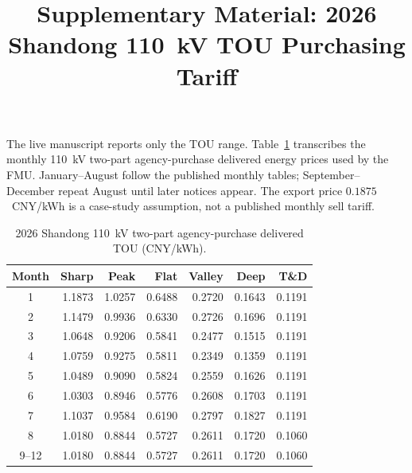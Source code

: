 \documentclass[conference]{IEEEtran}
\begin{document}
\title{Supplementary Material: 2026 Shandong 110~kV TOU Purchasing Tariff}
\author{}
\maketitle

The live manuscript reports only the TOU range. Table~\ref{tab:tou-monthly} transcribes the monthly 110~kV two-part agency-purchase delivered energy prices used by the FMU. January--August follow the published monthly tables; September--December repeat August until later notices appear. The export price \(0.1875\)~CNY/kWh is a case-study assumption, not a published monthly sell tariff.

\begin{table}[!t]
\centering
\caption{2026 Shandong 110~kV two-part agency-purchase delivered TOU (CNY/kWh).}
\label{tab:tou-monthly}
\scriptsize
\begin{tabular}{@{}crrrrrr@{}}
\toprule
Month & Sharp & Peak & Flat & Valley & Deep & T\&D \\
\midrule
1 & 1.1873 & 1.0257 & 0.6488 & 0.2720 & 0.1643 & 0.1191 \\
2 & 1.1479 & 0.9936 & 0.6330 & 0.2726 & 0.1696 & 0.1191 \\
3 & 1.0648 & 0.9206 & 0.5841 & 0.2477 & 0.1515 & 0.1191 \\
4 & 1.0759 & 0.9275 & 0.5811 & 0.2349 & 0.1359 & 0.1191 \\
5 & 1.0489 & 0.9090 & 0.5824 & 0.2559 & 0.1626 & 0.1191 \\
6 & 1.0303 & 0.8946 & 0.5776 & 0.2608 & 0.1703 & 0.1191 \\
7 & 1.1037 & 0.9584 & 0.6190 & 0.2797 & 0.1827 & 0.1191 \\
8 & 1.0180 & 0.8844 & 0.5727 & 0.2611 & 0.1720 & 0.1060 \\
9--12 & 1.0180 & 0.8844 & 0.5727 & 0.2611 & 0.1720 & 0.1060 \\
\bottomrule
\end{tabular}
\end{table}
\end{document}
